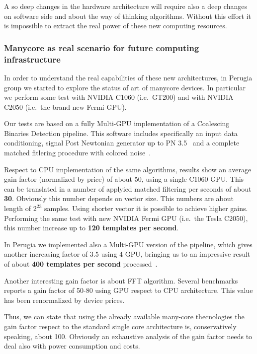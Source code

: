A so deep changes in the hardware architecture will require also a deep changes on software side and about 
the way of thinking algorithms. Without this effort it is impossible to extract the real power of these new computing resources.


\subsubsection{Manycore as real scenario for future computing infrastructure}\label{sec:manycor}

In order to understand the real capabilities of these new architectures, in Perugia group we started to explore the status of art of manycore devices. In particular we perform some test with NVIDIA C1060 (i.e.\ GT200) and with NVIDIA C2050 (i.e.\ the brand new Fermi GPU). 

Our tests are based on a fully Multi-GPU implementation of a Coalescing Binaries Detection pipeline. This software includes specifically an input data conditioning, signal Post Newtonian generator up to PN 3.5~\cite{PGTesiPN} and a complete matched fitlering procedure with colored noise~\cite{GPUarxive}.

Respect to CPU implementation  of the same algorithms, results show an average gain factor (normalized by price) of about 50, using a single C1060
GPU. This can be translated in a number of applyied matched filtering per seconds of about {\bf 30}. Obviously this number depends on vector size. This numbers are about length of $2^23$ samples. Using shorter vector it is possible to achieve higher gains.  Performing the same test with new NVIDIA Fermi GPU (i.e.\ the Tesla C2050), 
this number increase up to {\bf 120 templates per second}. 

In Perugia we implemented also a Multi-GPU version of the pipeline, which gives another increasing factor of 3.5 using 4 GPU, bringing us to an
impressive result of about {\bf 400 templates per second} processed~\cite{PGTesiMULTI}. 

Another interesting gain factor is about FFT algorithm. Several benchmarks reports a gain factor of  50-80 using GPU respect to CPU architecture. This value has been renormalized by device prices.

Thus, we can state that using the already available many-core thecnologies the gain factor respect to the standard single core architecture is, conservatively speaking, about 100. Obviously an exhaustive analysis of the gain factor needs to deal also with power consumption and costs.   




\FloatBarrier
%

